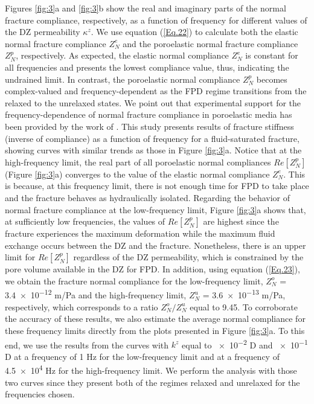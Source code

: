 \documentclass[draft]{agujournal2019}
\begin{document}
Figures \ref{fig:3}a and \ref{fig:3}b show the real and imaginary parts of the normal fracture compliance, respectively, as a function of frequency for different values of the DZ permeability 
$\kappa^z$. We use equation (\ref{Eq.22}) to calculate both the elastic normal fracture compliance $Z_N^e$ and the poroelastic normal fracture compliance $Z_N^p$, respectively. As expected, the elastic normal compliance $Z_N^e$ is constant for all frequencies and presents the lowest compliance value, thus, indicating the undrained limit. In contrast, the poroelastic normal compliance $Z_N^p$  becomes complex-valued and frequency-dependent as the FPD regime transitions from the relaxed  to the unrelaxed states. 
We point out that experimental support for the frequency-dependence of normal fracture compliance in poroelastic media has been provided by the work of . This study presents results of fracture stiffness (inverse of compliance) as a function of frequency for a fluid-saturated fracture, showing curves with similar trends as those in Figure \ref{fig:3}a.
Notice that at the high-frequency limit, the real part of all poroelastic normal compliances $Re[Z_N^p]$ (Figure \ref{fig:3}a) converges to the value of the elastic normal compliance $Z_N^e$. This is because, at this frequency limit, there is not enough time for FPD to take place and the fracture behaves as hydraulically isolated.
Regarding the behavior of normal fracture compliance at the low-frequency limit, Figure \ref{fig:3}a shows that,
at sufficiently low frequencies, the values of $Re[Z_N^p]$ are highest since the fracture experiences the maximum deformation while the maximum fluid exchange occurs between the DZ and the fracture. Nonetheless, there is an upper limit for $Re[Z_N^p]$ regardless of the DZ permeability, which is constrained by  the pore volume available in the DZ for FPD. 
In addition, using equation (\ref{Eq.23}), we obtain the fracture normal compliance for the low-frequency limit, $Z_N^o$ = \num{3.4e-12} m/Pa and the
high-frequency limit, $Z_N^u$ =  \num{3.6e-13}  m/Pa, respectively, which corresponds to a ratio $Z_N^o/Z_N^u$ equal to 9.45. 
To corroborate the accuracy of these results, we also estimate the average normal compliance for these frequency limits directly from the plots presented in Figure \ref{fig:3}a. To this end, we use the results from the curves with $k^z$ equal to \num{e-2} D and \num{e-1} D at a frequency of 1 Hz for the low-frequency limit and at a frequency of \num{4.5e4} Hz for the high-frequency limit. We perform the analysis with those two curves since they present both of the regimes relaxed and unrelaxed for the frequencies chosen. 
\end{document}

